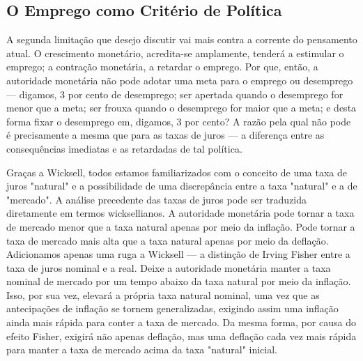 \documentclass[12pt]{article}
\begin{document}
\subsection*{O Emprego como Critério de Política}

A segunda limitação que desejo discutir vai mais contra a corrente do pensamento atual. O crescimento monetário, acredita-se amplamente, tenderá a estimular o emprego; a contração monetária, a retardar o emprego. Por que, então, a autoridade monetária não pode adotar uma meta para o emprego ou desemprego — digamos, 3 por cento de desemprego; ser apertada quando o desemprego for menor que a meta; ser frouxa quando o desemprego for maior que a meta; e desta forma fixar o desemprego em, digamos, 3 por cento? A razão pela qual não pode é precisamente a mesma que para as taxas de juros — a diferença entre as consequências imediatas e as retardadas de tal política.

Graças a Wicksell, todos estamos familiarizados com o conceito de uma taxa de juros "natural" e a possibilidade de uma discrepância entre a taxa "natural" e a de "mercado". A análise precedente das taxas de juros pode ser traduzida diretamente em termos wicksellianos. A autoridade monetária pode tornar a taxa de mercado menor que a taxa natural apenas por meio da inflação. Pode tornar a taxa de mercado mais alta que a taxa natural apenas por meio da deflação. Adicionamos apenas uma ruga a Wicksell — a distinção de Irving Fisher entre a taxa de juros nominal e a real. Deixe a autoridade monetária manter a taxa nominal de mercado por um tempo abaixo da taxa natural por meio da inflação. Isso, por sua vez, elevará a própria taxa natural nominal, uma vez que as antecipações de inflação se tornem generalizadas, exigindo assim uma inflação ainda mais rápida para conter a taxa de mercado. Da mesma forma, por causa do efeito Fisher, exigirá não apenas deflação, mas uma deflação cada vez mais rápida para manter a taxa de mercado acima da taxa "natural" inicial.
\end{document}
